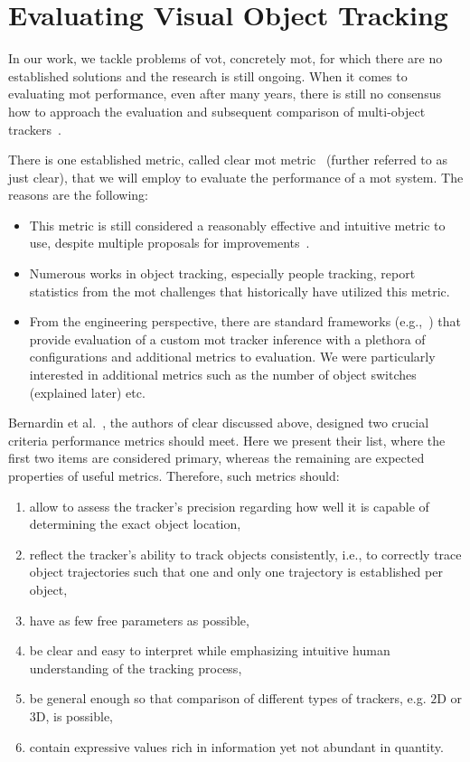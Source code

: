 \section{Evaluating Visual Object Tracking}
\label{sec:EvaluatingVisualObjectTracking}

In our work, we tackle problems of \Gls{vot}, concretely \gls{mot}, for which there are no established solutions and the research is still ongoing. When it comes to evaluating \gls{mot} performance, even after many years, there is still no consensus how to approach the evaluation and subsequent comparison of multi-object trackers~\cite{Bernardin2008}.

There is one established metric, called \gls{clear} \gls{mot} metric~\cite{Bernardin2008} (further referred to as just \gls{clear}), that we will employ to evaluate the performance of a \gls{mot} system. The reasons are the following:
\begin{itemize}
    \item This metric is still considered a reasonably effective and intuitive metric to use, despite multiple proposals for improvements~\cite{CVIU_UA-DETRAC}.
    \item Numerous works in object tracking, especially people tracking, report statistics from the \gls{mot} challenges that historically have utilized this metric.
    \item From the engineering perspective, there are standard frameworks (e.g.,~\cite{pymotmetrics}) that provide evaluation of a custom \gls{mot} tracker inference with a plethora of configurations and additional metrics to evaluation. We were particularly interested in additional metrics such as the number of object switches (explained later) etc.
\end{itemize}

Bernardin et al.~\cite{Bernardin2008}, the authors of \gls{clear} discussed above, designed two crucial criteria performance metrics should meet. Here we present their list, where the first two items are considered primary, whereas the remaining are expected properties of useful metrics. Therefore, such metrics should:
\begin{enumerate}
    \item allow to assess the tracker's precision regarding how well it is capable of determining the exact object location,
    \item reflect the tracker's ability to track objects consistently, i.e., to correctly trace object trajectories such that one and only one trajectory is established per object,
    \item have as few free parameters as possible,
    \item be clear and easy to interpret while emphasizing intuitive human understanding of the tracking process,
    \item be general enough so that comparison of different types of trackers, e.g. $2$D or $3$D, is possible,
    \item contain expressive values rich in information yet not abundant in quantity.
\end{enumerate}

